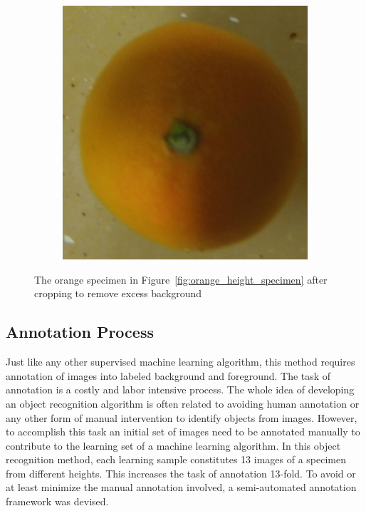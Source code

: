 \documentclass {udthesis}
\begin{document}
\begin{figure}
\begin{subfigure}[]{0.12\textwidth}
      \caption{}
  \end{subfigure}
  \begin{subfigure}[]{0.12\textwidth}
      \includegraphics[width=\textwidth]{orange4_obj_11/orange4_011_08}
      \caption{}
  \end{subfigure}
\caption[Images of an orange specimen after cropping excess background]{The orange specimen in Figure~\ref{fig:orange_height_specimen} after cropping to remove excess background}
\label{fig:orange_height_specimen_cropped}
\end{figure}	


\subsection{Annotation Process}
\label{sec:annotation}

Just like any other supervised machine learning algorithm, this method requires annotation of images into labeled background and foreground. The task of annotation is a costly and labor intensive process. The whole idea of developing an object recognition algorithm is often related to avoiding human annotation or any other form of manual intervention to identify objects from images. However, to accomplish this task an initial set of images need to be annotated manually to contribute to the learning set of a machine learning algorithm. In this object recognition method, each learning sample constitutes 13 images of a specimen from different heights. This increases the task of annotation 13-fold. To avoid or at least minimize the manual annotation involved, a semi-automated annotation framework was devised.
\end{document}
